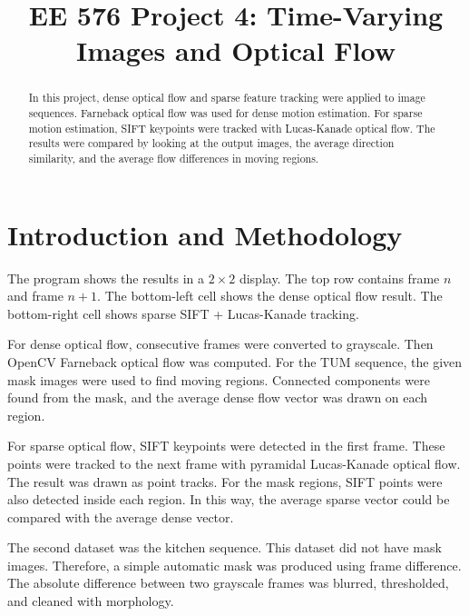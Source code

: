 \documentclass[conference]{IEEEtran}
\begin{document}
\title{EE 576 Project 4: Time-Varying Images and Optical Flow}

\author{
}

\maketitle

\thispagestyle{empty}
\pagestyle{empty}

\begin{abstract}
In this project, dense optical flow and sparse feature tracking were applied to image sequences. Farneback optical flow was used for dense motion estimation. For sparse motion estimation, SIFT keypoints were tracked with Lucas-Kanade optical flow. The results were compared by looking at the output images, the average direction similarity, and the average flow differences in moving regions.
\end{abstract}

\section{Introduction and Methodology}

The program shows the results in a $2 \times 2$ display. The top row contains frame $n$ and frame $n+1$. The bottom-left cell shows the dense optical flow result. The bottom-right cell shows sparse SIFT + Lucas-Kanade tracking.

For dense optical flow, consecutive frames were converted to grayscale. Then OpenCV Farneback optical flow was computed. For the TUM sequence, the given mask images were used to find moving regions. Connected components were found from the mask, and the average dense flow vector was drawn on each region.

For sparse optical flow, SIFT keypoints were detected in the first frame. These points were tracked to the next frame with pyramidal Lucas-Kanade optical flow. The result was drawn as point tracks. For the mask regions, SIFT points were also detected inside each region. In this way, the average sparse vector could be compared with the average dense vector.

The second dataset was the kitchen sequence. This dataset did not have mask images. Therefore, a simple automatic mask was produced using frame difference. The absolute difference between two grayscale frames was blurred, thresholded, and cleaned with morphology.
\end{document}
